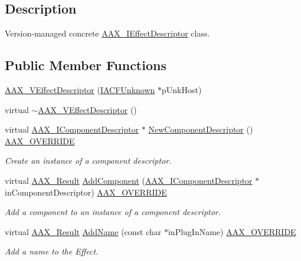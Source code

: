 \subsection{Description}
Version-\/managed concrete \hyperlink{a00096}{A\+A\+X\+\_\+\+I\+Effect\+Descriptor} class. \subsection*{Public Member Functions}
\begin{DoxyCompactItemize}
\item 
\hyperlink{a00134_a039643848c3e718abccef382c3b9d3c9}{A\+A\+X\+\_\+\+V\+Effect\+Descriptor} (\hyperlink{a00146}{I\+A\+C\+F\+Unknown} $\ast$p\+Unk\+Host)
\item 
virtual \hyperlink{a00134_a66d507b34e79e25846dc25d8e402e035}{$\sim$\+A\+A\+X\+\_\+\+V\+Effect\+Descriptor} ()
\item 
virtual \hyperlink{a00088}{A\+A\+X\+\_\+\+I\+Component\+Descriptor} $\ast$ \hyperlink{a00134_a894a65109b25f9873da71a327fab9164}{New\+Component\+Descriptor} () \hyperlink{a00149_ac2f24a5172689ae684344abdcce55463}{A\+A\+X\+\_\+\+O\+V\+E\+R\+R\+I\+D\+E}
\begin{DoxyCompactList}\small\item\em Create an instance of a component descriptor. \end{DoxyCompactList}\item 
virtual \hyperlink{a00149_a4d8f69a697df7f70c3a8e9b8ee130d2f}{A\+A\+X\+\_\+\+Result} \hyperlink{a00134_acfa2a361c849dbf02eaa276e185be7ba}{Add\+Component} (\hyperlink{a00088}{A\+A\+X\+\_\+\+I\+Component\+Descriptor} $\ast$in\+Component\+Descriptor) \hyperlink{a00149_ac2f24a5172689ae684344abdcce55463}{A\+A\+X\+\_\+\+O\+V\+E\+R\+R\+I\+D\+E}
\begin{DoxyCompactList}\small\item\em Add a component to an instance of a component descriptor. \end{DoxyCompactList}\item 
virtual \hyperlink{a00149_a4d8f69a697df7f70c3a8e9b8ee130d2f}{A\+A\+X\+\_\+\+Result} \hyperlink{a00134_ac57e2ba1f46386ba3609564ea7200f47}{Add\+Name} (const char $\ast$in\+Plug\+In\+Name) \hyperlink{a00149_ac2f24a5172689ae684344abdcce55463}{A\+A\+X\+\_\+\+O\+V\+E\+R\+R\+I\+D\+E}
\begin{DoxyCompactList}\small\item\em Add a name to the Effect. \end{DoxyCompactList}\item 

\end{DoxyCompactItemize}
